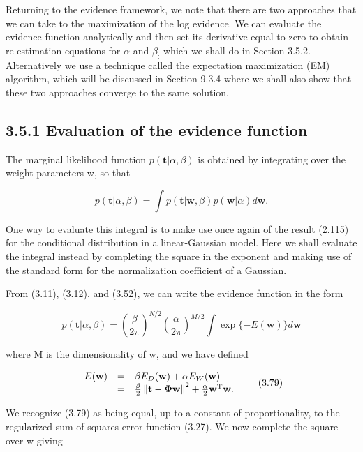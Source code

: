 \documentclass[
  10
]{article}
\begin{document}
Returning to the evidence framework, we note that there are two
approaches that we can take to the maximization of the log evidence. We
can evaluate the evidence function analytically and then set its
derivative equal to zero to obtain re-estimation equations for
\(\alpha\) and \(\beta _ { : }\) which we shall do in Section 3.5.2.
Alternatively we use a technique called the expectation maximization
(EM) algorithm, which will be discussed in Section 9.3.4 where we shall
also show that these two approaches converge to the same solution.

\subsection{3.5.1 Evaluation of the evidence
function}\label{evaluation-of-the-evidence-function}

The marginal likelihood function
\(p ( \mathbf { t } | \alpha , \beta )\) is obtained by integrating over
the weight parameters w, so that

\[
p (\mathbf {t} | \alpha , \beta) = \int p (\mathbf {t} | \mathbf {w}, \beta) p (\mathbf {w} | \alpha) d \mathbf {w}.\tag{3.77}
\]

One way to evaluate this integral is to make use once again of the
result (2.115) for the conditional distribution in a linear-Gaussian
model. Here we shall evaluate the integral instead by completing the
square in the exponent and making use of the standard form for the
normalization coefficient of a Gaussian.

From (3.11), (3.12), and (3.52), we can write the evidence function in
the form

\[
p (\mathbf {t} | \alpha , \beta) = \left(\frac {\beta}{2 \pi}\right) ^ {N / 2} \left(\frac {\alpha}{2 \pi}\right) ^ {M / 2} \int \exp \{- E (\mathbf {w}) \} d \mathbf {w}\tag{3.78}
\]

where M is the dimensionality of w, and we have defined

\[
\begin{array}{r c l} E (\mathbf {w}) & = & \beta E _ {D} (\mathbf {w}) + \alpha E _ {W} (\mathbf {w}) \\ & = & \frac {\beta}{2} \left\| \mathbf {t} - \boldsymbol {\Phi} \mathbf {w} \right\| ^ {2} + \frac {\alpha}{2} \mathbf {w} ^ {\mathrm{T}} \mathbf {w}. \end{array}\tag{3.79}
\]

We recognize (3.79) as being equal, up to a constant of proportionality,
to the regularized sum-of-squares error function (3.27). We now complete
the square over w giving
\end{document}
